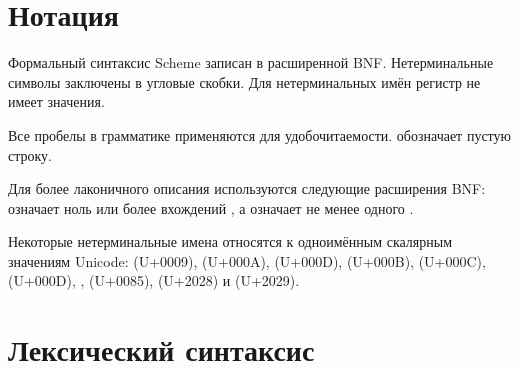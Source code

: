 \section{Нотация}
\label{BNF}

Формальный синтаксис Scheme записан в расширенной BNF. Нетерминальные символы заключены в
угловые скобки. Для нетерминальных имён регистр не имеет значения.

Все пробелы в грамматике применяются для удобочитаемости.  обозначает пустую строку.

Для более лаконичного описания используются следующие расширения BNF:  означает
ноль или более вхождений , а  означает не менее
одного .

Некоторые нетерминальные имена относятся к одноимённым скалярным значениям Unicode:
 (U+0009),  (U+000A),  (U+000D),
 (U+000B),  (U+000C),  (U+000D),
,  (U+0085),  (U+2028) и
 (U+2029).\vspace{-1mm}

\section{Лексический синтаксис}
\label{lexicalsyntaxsection}

